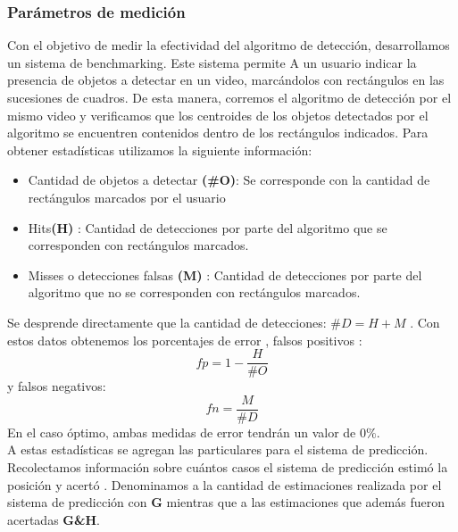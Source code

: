 \subsubsection{Parámetros de medición}
Con el objetivo de  medir la efectividad del algoritmo de detección, desarrollamos un sistema de benchmarking. Este sistema permite
A un usuario indicar la presencia de objetos a detectar en un video, marcándolos con rectángulos en las sucesiones de cuadros. De esta
manera, corremos el algoritmo de detección por el mismo video y verificamos que los centroides de los objetos detectados por el algoritmo 
se encuentren contenidos dentro de los rectángulos indicados.  Para obtener estadísticas utilizamos la siguiente información:
\begin{itemize}
\item { Cantidad de objetos a detectar \textbf{(\#O)}: Se corresponde con la cantidad de rectángulos marcados por el usuario}
\item { Hits\textbf{(H)} : Cantidad de detecciones por parte del algoritmo que se corresponden con rectángulos marcados.}
\item { Misses o detecciones falsas \textbf{(M)} : Cantidad de detecciones por parte del algoritmo que no se corresponden con rectángulos marcados.}
\end{itemize}
Se desprende directamente que la cantidad de detecciones: 
\textbf{$\#D=H+M$} .
Con estos datos obtenemos los porcentajes de error , falsos positivos : 
\[
	fp=1 - \frac{H}{\# O}
\]
y falsos negativos:
\[
	fn=\frac{M}{\# D}
\]
En el caso óptimo, ambas medidas de error tendrán un valor de $0\%$.  \\
\indent A estas estadísticas se agregan las particulares para el sistema de predicción. Recolectamos información sobre
cuántos casos el sistema de predicción estimó la posición y acertó . Denominamos
a la cantidad de estimaciones realizada por el sistema de predicción 
con \textbf{G} mientras que a las estimaciones que además fueron 
acertadas \textbf{G\&H}.

